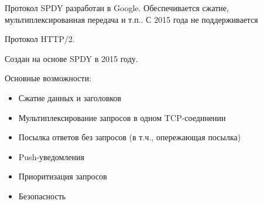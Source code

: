 
Протокол SPDY разработан в Google. Обеспечивается сжатие, мультиплексированная передача и т.п.. С 2015 года не поддерживается

Протокол HTTP/2.

Создан на основе SPDY в 2015 году.

Основные возможности:
\begin{itemize}
    \item Сжатие данных и заголовков
    \item Мультиплексирование запросов в одном TCP-соединении
    \item Посылка ответов без запросов (в т.ч., опережающая посылка)
    \item Push-уведомления
    \item Приоритизация запросов
    \item Безопасность
\end{itemize}
